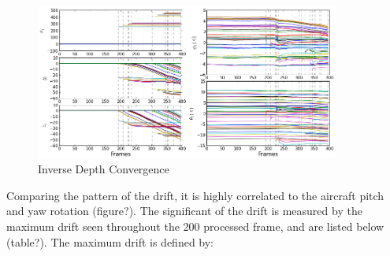 \begin{figure}[h]
\centering
\includegraphics[width=10cm, keepaspectratio=true]
{./Figures/fltfig/cut1/Figure20.png}
\caption{Inverse Depth Convergence}
\label{fltfig:2}
\end{figure}
Comparing the pattern of the drift, it is highly 
correlated to the aircraft pitch and yaw rotation (figure?). The 
significant of the drift is measured by the maximum drift seen 
throughout the 200 processed frame, and are listed below (table?). The 
maximum drift is defined by:


